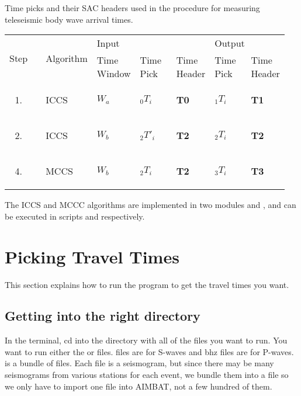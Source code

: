 \documentclass[letterpaper,10pt,english]{sphinxmanual}
\begin{document}
\begin{threeparttable}
\capstart\caption{Time picks and their SAC headers used in the procedure for measuring teleseismic body wave arrival times.}\label{docfiles/PickingTravelTimes:id2}
\begin{tabular}{|p{0.136\linewidth}|p{0.136\linewidth}|p{0.136\linewidth}|p{0.136\linewidth}|p{0.136\linewidth}|p{0.136\linewidth}|p{0.136\linewidth}|}
\hline
 \multirow{2}{*}{
Step
} &  \multirow{2}{*}{
Algorithm
} &  \multicolumn{3}{l|}{
Input
} &  \multicolumn{2}{l|}{
Output
}\\
\cline{3-7} &  & 
Time Window
 & 
Time Pick
 & 
Time Header
 & 
Time Pick
 & 
Time Header
\\
\hline\begin{enumerate}
\item {} 
\end{enumerate}
 & 
ICCS
 & 
\(W_a\)
 & 
\(_0T_i\)
 & 
\textbf{T0}
 & 
\(_1T_i\)
 & 
\textbf{T1}
\\
\hline\begin{enumerate}
\setcounter{enumi}{1}
\item {} 
\end{enumerate}
 & 
ICCS
 & 
\(W_b\)
 & 
\(_2T'_i\)
 & 
\textbf{T2}
 & 
\(_2T_i\)
 & 
\textbf{T2}
\\
\hline\begin{enumerate}
\setcounter{enumi}{3}
\item {} 
\end{enumerate}
 & 
MCCS
 & 
\(W_b\)
 & 
\(_2T_i\)
 & 
\textbf{T2}
 & 
\(_3T_i\)
 & 
\textbf{T3}
\\
\hline\end{tabular}

\end{threeparttable}


The ICCS and MCCC algorithms are implemented in two modules  and , and can be executed in scripts  and  respectively.


\section{Picking Travel Times}
\label{docfiles/PickingTravelTimes:picking-travel-times}
This section explains how to run the program  to get the travel times you want.


\subsection{Getting into the right directory}
\label{docfiles/PickingTravelTimes:getting-into-the-right-directory}
In the terminal, cd into the directory with all of the  files you want to run. You want to run either the  or  files.  files are for S-waves and bhz files are for P-waves.  is a bundle of  files. Each  file is a seismogram, but since there may be many seismograms from various stations for each event, we bundle them into a  file so we only have to import one file into AIMBAT, not a few hundred of them.
\end{document}
